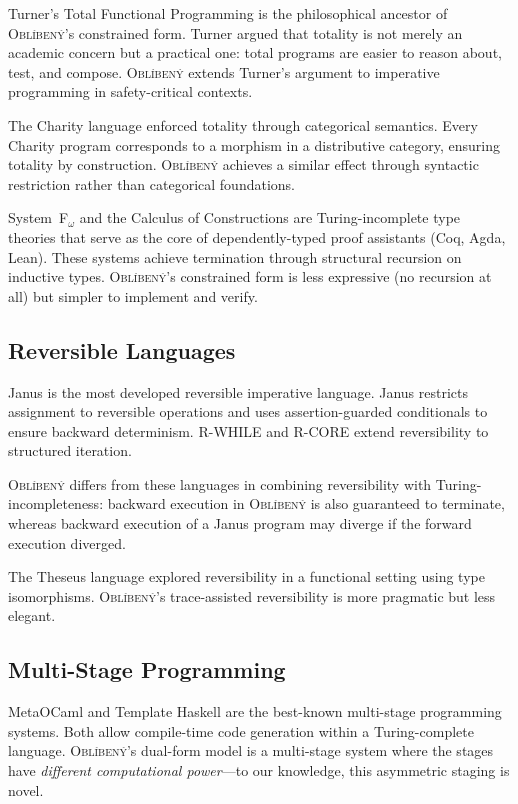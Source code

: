 \documentclass[11pt,a4paper]{article}
\newcommand{\obl}{\textsc{Obl\'{i}ben\'{y}}}
\begin{document}
Turner's Total Functional Programming \citep{turner2004total} is the
philosophical ancestor of \obl{}'s constrained form.  Turner argued that
totality is not merely an academic concern but a practical one: total programs
are easier to reason about, test, and compose.  \obl{} extends Turner's
argument to imperative programming in safety-critical contexts.

The Charity language \citep{cockett1992charity} enforced totality through
categorical semantics.  Every Charity program corresponds to a morphism in a
distributive category, ensuring totality by construction.  \obl{} achieves a
similar effect through syntactic restriction rather than categorical
foundations.

System~F$_\omega$ and the Calculus of Constructions are Turing-incomplete
type theories that serve as the core of dependently-typed proof assistants
(Coq, Agda, Lean).  These systems achieve termination through structural
recursion on inductive types.  \obl{}'s constrained form is less expressive
(no recursion at all) but simpler to implement and verify.

\subsection{Reversible Languages}

Janus \citep{yokoyama2007reversible} is the most developed reversible
imperative language.  Janus restricts assignment to reversible operations and
uses assertion-guarded conditionals to ensure backward determinism.  R-WHILE
\citep{gluck2012rwhile} and R-CORE extend reversibility to structured
iteration.

\obl{} differs from these languages in combining reversibility with
Turing-incompleteness: backward execution in \obl{} is also guaranteed to
terminate, whereas backward execution of a Janus program may diverge if the
forward execution diverged.

The Theseus language \citep{james2014theseus} explored reversibility in a
functional setting using type isomorphisms.  \obl{}'s trace-assisted
reversibility is more pragmatic but less elegant.

\subsection{Multi-Stage Programming}

MetaOCaml \citep{kiselyov2014metaocaml} and Template Haskell
\citep{sheard2002template} are the best-known multi-stage programming
systems.  Both allow compile-time code generation within a
Turing-complete language.  \obl{}'s dual-form model is a multi-stage system
where the stages have \emph{different computational power}---to our knowledge,
this asymmetric staging is novel.
\end{document}
